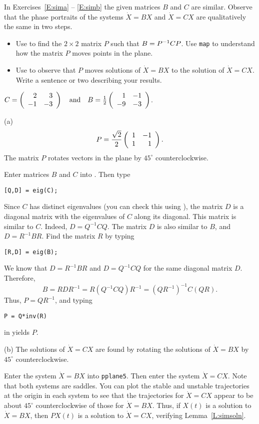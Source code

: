 \documentclass{ximera}
\begin{document}
\noindent In Exercises~\ref{E:sima} -- \ref{E:simb} the given matrices $B$
and $C$ are similar.  Observe that the phase portraits of the systems
$\dot{X}=BX$ and $\dot{X}=CX$ are qualitatively the same in two steps.
\begin{itemize}
\item[(a)]  Use \Matlab to find the $2\times 2$ matrix $P$ such that
$B=P^{-1} CP$.  Use {\tt map} to understand how the matrix $P$ moves points 
in the plane.
\item[(b)]  Use {\pplane} to observe that $P$ moves solutions of
$\dot{X}=BX$ to the solution of $\dot{X}=CX$.  Write a sentence or two describing your results.
\end{itemize}
\begin{computerExercise} \label{E:sima}
$C = \left(\begin{array}{rr} 2 & 3\\ -1 &-3\end{array}\right) \quad\mbox{and}\quad B = \frac{1}{2}\left(\begin{array}{rr} 1 & -1\\ -9 &-3\end{array}\right)$.

\begin{solution}

(a) \ans
\[
P = \frac{\sqrt{2}}{2}\left(\begin{array}{rr} 1 & -1\\ 1 &1\end{array}\right).
\]
The matrix $P$ rotates vectors in the plane by $45^\circ$ counterclockwise.

\soln Enter matrices $B$ and $C$ into \Matlabp.  Then type
\begin{verbatim}
[Q,D] = eig(C);
\end{verbatim}
Since $C$ has distinct eigenvalues (you can check this using
\Matlabp), the matrix $D$ is a diagonal matrix with the eigenvalues of
$C$ along its diagonal.  This matrix is similar to $C$.  Indeed, $D =
Q^{-1}CQ$.  The matrix $D$ is also similar to $B$, and $D= R^{-1}BR$.
Find the matrix $R$ by typing
\begin{verbatim}
[R,D] = eig(B);
\end{verbatim}
We know that $D = R^{-1}BR$ and $D = Q^{-1}CQ$ for the same diagonal
matrix $D$.  Therefore,
\[
B = RDR^{-1} = R(Q^{-1}CQ)R^{-1} = (QR^{-1})^{-1}C(QR).
\]
Thus, $P = QR^{-1}$, and typing
\begin{verbatim}
P = Q*inv(R)
\end{verbatim}
in \Matlab yields $P$.

(b) \ans The solutions of $\dot{X} = CX$ are found by rotating the
solutions of $\dot{X} = BX$ by $45^\circ$ counterclockwise.

\soln Enter the system $\dot{X} = BX$ into {\tt pplane5}.  Then enter the
system $\dot{X} = CX$.  Note that both systems are saddles.  You can
plot the stable and unstable trajectories at the origin in each system
to see that the trajectories for $\dot{X} = CX$ appear to be about
$45^\circ$ counterclockwise of those for $\dot{X} = BX$.  Thus, if
$X(t)$ is a solution to $\dot{X} = BX$, then $PX(t)$ is a solution to
$\dot{X} = CX$, verifying Lemma~\ref{L:simsoln}.

\end{solution}

\end{computerExercise}
\end{document}
